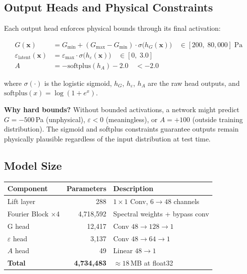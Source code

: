 \documentclass[11pt,letterpaper]{article}
\newcommand{\xvec}{\bm{x}}
\newcommand{\eps}{\varepsilon_{\mathrm{latent}}}
\begin{document}
\subsection{Output Heads and Physical Constraints}

Each output head enforces physical bounds through its final activation:

\begin{keybox}
\begin{align}
    G(\xvec) &= G_{\min} + (G_{\max} - G_{\min})\cdot\sigma\bigl(h_G(\xvec)\bigr)
    \quad \in [200,\;80{,}000]\;\text{Pa} \label{eq:Ghead} \\[4pt]
    \eps(\xvec) &= \varepsilon_{\max} \cdot \sigma\bigl(h_\varepsilon(\xvec)\bigr)
    \quad \in [0,\;3.0] \label{eq:epshead} \\[4pt]
    A &= -\mathrm{softplus}(h_A) - 2.0
    \quad < -2.0 \label{eq:ahead}
\end{align}
\end{keybox}

where $\sigma(\cdot)$ is the logistic sigmoid, $h_G$, $h_\varepsilon$, $h_A$ are the
raw head outputs, and $\mathrm{softplus}(x) = \log(1 + e^x)$.

\textbf{Why hard bounds?} Without bounded activations, a network might predict
$G = -500$\,Pa (unphysical), $\varepsilon < 0$ (meaningless), or $A = +100$
(outside training distribution). The sigmoid and softplus constraints guarantee
outputs remain physically plausible regardless of the input distribution at test time.

\subsection{Model Size}

\begin{center}
\begin{tabular}{lrl}
\toprule
Component & Parameters & Description \\
\midrule
Lift layer & 288 & $1\times1$ Conv, $6\to48$ channels \\
Fourier Block $\times$4 & 4,718,592 & Spectral weights + bypass conv\\
G head & 12,417 & Conv $48\to128\to1$ \\
$\varepsilon$ head & 3,137 & Conv $48\to64\to1$ \\
$A$ head & 49 & Linear $48\to1$ \\
\midrule
\textbf{Total} & \textbf{4,734,483} & $\approx 18$\,MB at float32 \\
\bottomrule
\end{tabular}
\end{center}
\end{document}
